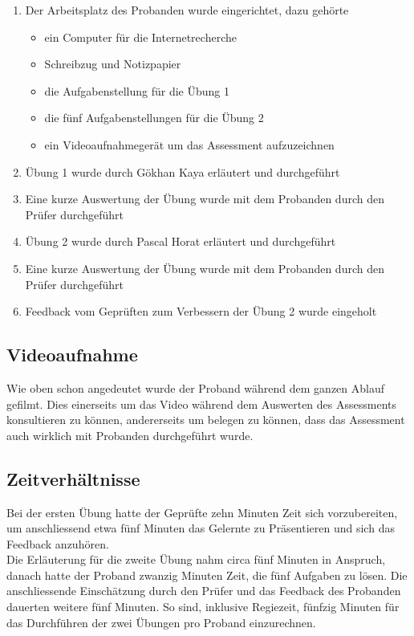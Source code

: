 \begin{enumerate}
\item Der Arbeitsplatz des Probanden wurde eingerichtet, dazu gehörte
\begin{itemize}
\item ein Computer für die Internetrecherche
\item Schreibzug und Notizpapier
\item die Aufgabenstellung für die Übung 1
\item die fünf Aufgabenstellungen für die Übung 2
\item ein Videoaufnahmegerät um das Assessment aufzuzeichnen
\end{itemize}
\item Übung 1 wurde durch Gökhan Kaya erläutert und durchgeführt
\item Eine kurze Auswertung der Übung wurde mit dem Probanden durch den Prüfer durchgeführt
\item Übung 2 wurde durch Pascal Horat erläutert und durchgeführt
\item Eine kurze Auswertung der Übung wurde mit dem Probanden durch den Prüfer durchgeführt
\item Feedback vom Geprüften zum Verbessern der Übung 2 wurde eingeholt
\end{enumerate}

\subsection{Videoaufnahme}

Wie oben schon angedeutet wurde der Proband während dem ganzen Ablauf gefilmt. Dies einerseits um das Video während dem Auswerten des Assessments konsultieren zu können, andererseits um belegen zu können, dass das Assessment auch wirklich mit Probanden durchgeführt wurde.
\subsection{Zeitverhältnisse} \label{ssec:Zeitverhaeltnisse}
Bei der ersten Übung hatte der Geprüfte zehn Minuten Zeit sich vorzubereiten, um anschliessend etwa fünf Minuten das Gelernte zu Präsentieren und sich das Feedback anzuhören.\\ Die Erläuterung für die zweite Übung nahm circa fünf Minuten in Anspruch, danach hatte der Proband zwanzig Minuten Zeit, die fünf Aufgaben zu lösen. Die anschliessende Einschätzung durch den Prüfer und das Feedback des Probanden dauerten weitere fünf Minuten. So sind, inklusive Regiezeit, fünfzig Minuten für das Durchführen der zwei Übungen pro Proband einzurechnen.
